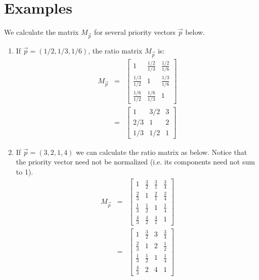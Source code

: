 \documentclass[10pt,twoside]{article}
\begin{document}
\section{Examples}
We calculate the matrix $M_{\vec{p}}$ for several priority vectors $\vec{p}$ below.
\begin{enumerate}
	\item If $\vec{p} = (1/2, 1/3, 1/6)$, the ratio matrix $M_{\vec{p}}$ is:
	\begin{eqnarray*}
	M_{\vec{p}} &=&
	\begin{bmatrix}
		1 & \frac{1/2}{1/3} & \frac{1/2}{1/6} \\
		\frac{1/3}{1/2} & 1 & \frac{1/3}{1/6} \\
		\frac{1/6}{1/2} & \frac{1/6}{1/3} & 1
	\end{bmatrix} \\
	&=&
	\begin{bmatrix}
		1 & 3/2 & 3 \\
		2/3 & 1 & 2 \\
		1/3 & 1/2 & 1
	\end{bmatrix}
	\end{eqnarray*}
	\item If $\vec{p} = (3, 2, 1, 4)$ we can calculate the ratio matrix as below.  Notice that the priority vector need not be normalized (i.e. its components need not sum to 1).
	\begin{eqnarray*}
		M_{\vec{p}} &=&
		\begin{bmatrix}
			1 & \frac{3}{2} & \frac{3}{1}& \frac{3}{4} \\
			\frac{2}{3}& 1 & \frac{2}{1}& \frac{2}{4} \\
			\frac{1}{3} & \frac{1}{2} & 1 & \frac{1}{4} \\
			\frac{4}{3} & \frac{4}{2} & \frac{4}{1} & 1
		\end{bmatrix} \\
		&=&
		\begin{bmatrix}
			1 & \frac{3}{2} & 3 & \frac{3}{4} \\
			\frac{2}{3} & 1 & 2 & \frac{1}{2} \\
			\frac{1}{3} & \frac{1}{2} & 1 & \frac{1}{4} \\
			\frac{4}{3} & 2 & 4 & 1
		\end{bmatrix}
	\end{eqnarray*}
\end{enumerate}
\end{document}
